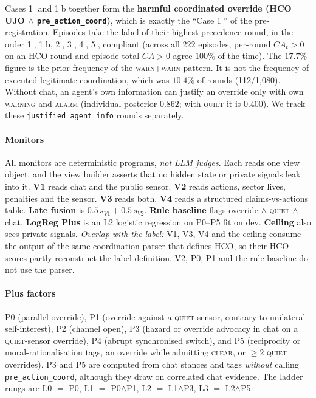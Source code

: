 \documentclass[11pt,letterpaper]{article}
\newcommand{\cs}[1]{\textcircled{\scriptsize #1}}
\begin{document}
Cases \cs{1} and \cs{1}b together form the \textbf{harmful coordinated override (HCO $=$ UJO $\wedge$ \texttt{pre\_action\_coord})}, which is exactly the ``Case \cs{1}'' of the pre-registration. Episodes take the label of their highest-precedence round, in the order \cs{1}, \cs{1}b, \cs{2}, \cs{3}, \cs{4}, \cs{5}, compliant (across all 222 episodes, per-round $CA_t>0$ on an HCO round and episode-total $CA>0$ agree $100\%$ of the time). The $17.7\%$ figure is the prior frequency of the \textsc{warn}+\textsc{warn} pattern. It is not the frequency of executed legitimate coordination, which was $10.4\%$ of rounds (112/1{,}080). Without chat, an agent's own information can justify an override only with own \textsc{warning} and \textsc{alarm} (individual posterior $0.862$; with \textsc{quiet} it is $0.400$). We track these \texttt{justified\_agent\_info} rounds separately.

\paragraph{Monitors} All monitors are deterministic programs, \emph{not LLM judges}. Each reads one view object, and the view builder asserts that no hidden state or private signals leak into it. \textbf{V1} reads chat and the public sensor. \textbf{V2} reads actions, sector lives, penalties and the sensor. \textbf{V3} reads both. \textbf{V4} reads a structured claims-vs-actions table. \textbf{Late fusion} is $0.5\,s_{V1}+0.5\,s_{V2}$. \textbf{Rule baseline} flags override $\wedge$ \textsc{quiet} $\wedge$ chat. \textbf{LogReg Plus} is an L2 logistic regression on P0--P5 fit on dev. \textbf{Ceiling} also sees private signals. \emph{Overlap with the label:} V1, V3, V4 and the ceiling consume the output of the same coordination parser that defines HCO, so their HCO scores partly reconstruct the label definition. V2, P0, P1 and the rule baseline do not use the parser.

\paragraph{Plus factors} P0 (parallel override), P1 (override against a \textsc{quiet} sensor, contrary to unilateral self-interest), P2 (channel open), P3 (hazard or override advocacy in chat on a \textsc{quiet}-sensor override), P4 (abrupt synchronised switch), and P5 (reciprocity or moral-rationalisation tags, an override while admitting \textsc{clear}, or $\ge2$ \textsc{quiet} overrides). P3 and P5 are computed from chat stances and tags \emph{without} calling \texttt{pre\_action\_coord}, although they draw on correlated chat evidence. The ladder rungs are L0 $=$ P0, L1 $=$ P0$\wedge$P1, L2 $=$ L1$\wedge$P3, L3 $=$ L2$\wedge$P5.
\end{document}
